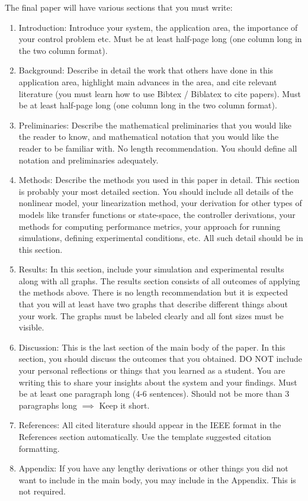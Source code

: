 \documentclass{ee122_notes}
\begin{document}
The final paper will have various sections that you must write:
\begin{enumerate}
\item Introduction: Introduce your system, the application area, the importance of your control problem etc. Must be at least half-page long (one column long in the two column format).
\item Background: Describe in detail the work that others have done in this application area, highlight main advances in the area, and cite relevant literature (you must learn how to use Bibtex / Biblatex to cite papers). Must be at least half-page long (one column long in the two column format).
\item Preliminaries: Describe the mathematical preliminaries that you would like the reader to know, and mathematical notation that you would like the reader to be familiar with. No length recommendation. You should define all notation and preliminaries adequately.
\item Methods: Describe the methods you used in this paper in detail. This section is probably your most detailed section. You should include all details of the nonlinear model, your linearization method, your derivation for other types of models like transfer functions or state-space, the controller derivations, your methods for computing performance metrics, your approach for running simulations, defining experimental conditions, etc. All such detail should be in this section. 
\item Results: In this section, include your simulation and experimental results along with all graphs. The results section consists of all outcomes of applying the methods above. There is no length recommendation but it is expected that you will at least have two graphs that describe different things about your work. The graphs must be labeled clearly and all font sizes must be visible.
\item Discussion: This is the last section of the main body of the paper. In this section, you should discuss the outcomes that you obtained. DO NOT include your personal reflections or things that you learned as a student. You are writing this to share your insights about the system and your findings. Must be at least one paragraph long (4-6 sentences). Should not be more than 3 paragraphs long $\implies$ Keep it short.
\item References: All cited literature should appear in the IEEE format in the References section automatically. Use the template suggested citation formatting.
\item Appendix: If you have any lengthy derivations or other things you did not want to include in the main body, you may include in the Appendix. This is not required.
\end{enumerate} 
\end{document}
